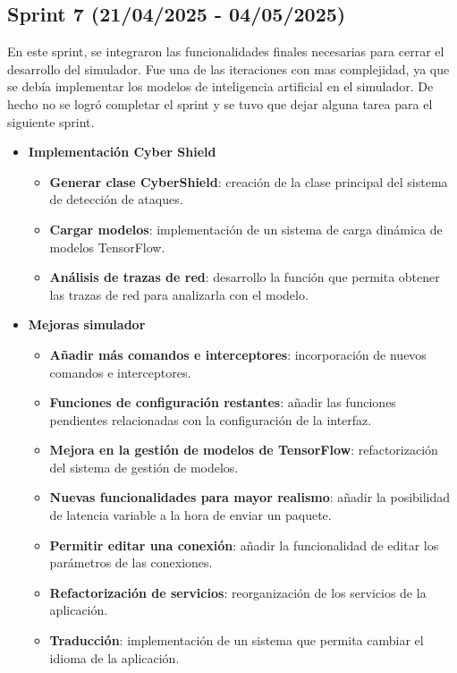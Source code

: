 \subsection{Sprint 7 (21/04/2025 - 04/05/2025)}
\label{subsec:SeptimoSprint}
En este sprint, se integraron las funcionalidades finales necesarias para cerrar el desarrollo del simulador. Fue una de las iteraciones con mas complejidad, ya que se debía implementar los modelos de inteligencia artificial en el simulador. De hecho no se logró completar el sprint y se tuvo que dejar alguna tarea para el siguiente sprint.

\begin{itemize}
    \item \textbf{Implementación Cyber Shield}
    \begin{itemize}
        \item \textbf{Generar clase CyberShield}: creación de la clase principal del sistema de detección de ataques.
        \item \textbf{Cargar modelos}: implementación de un sistema de carga dinámica de modelos TensorFlow.
        \item \textbf{Análisis de trazas de red}: desarrollo la función que permita obtener las trazas de red para analizarla con el modelo.
    \end{itemize}
    \item \textbf{Mejoras simulador}
    \begin{itemize}
        \item \textbf{Añadir más comandos e interceptores}: incorporación de nuevos comandos e interceptores.
        \item \textbf{Funciones de configuración restantes}: añadir las funciones pendientes relacionadas con la configuración de la interfaz.
        \item \textbf{Mejora en la gestión de modelos de TensorFlow}: refactorización del sistema de gestión de modelos.
        \item \textbf{Nuevas funcionalidades para mayor realismo}: añadir la posibilidad de latencia variable a la hora de enviar un paquete.
        \item \textbf{Permitir editar una conexión}: añadir la funcionalidad de editar los parámetros de las conexiones.
        \item \textbf{Refactorización de servicios}: reorganización de los servicios de la aplicación.
        \item \textbf{Traducción}: implementación de un sistema que permita cambiar el idioma de la aplicación.
    \end{itemize}
\end{itemize}

